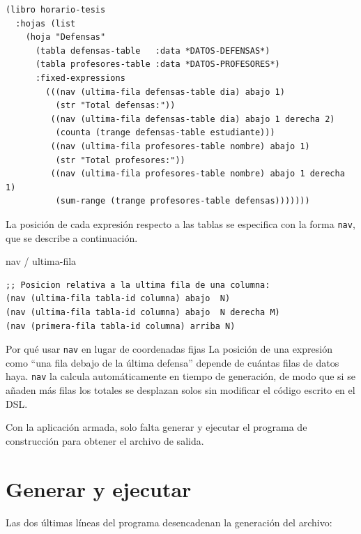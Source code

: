 \documentclass[12pt,a4paper]{report}
\begin{document}
\begin{lstlisting}[caption={Aplicación completa con totales de pie de tabla.}]
(libro horario-tesis
  :hojas (list
    (hoja "Defensas"
      (tabla defensas-table   :data *DATOS-DEFENSAS*)
      (tabla profesores-table :data *DATOS-PROFESORES*)
      :fixed-expressions
        (((nav (ultima-fila defensas-table dia) abajo 1)
          (str "Total defensas:"))
         ((nav (ultima-fila defensas-table dia) abajo 1 derecha 2)
          (counta (trange defensas-table estudiante)))
         ((nav (ultima-fila profesores-table nombre) abajo 1)
          (str "Total profesores:"))
         ((nav (ultima-fila profesores-table nombre) abajo 1 derecha 1)
          (sum-range (trange profesores-table defensas)))))))
\end{lstlisting}

La posición de cada expresión respecto a las tablas se especifica
con la forma \texttt{nav}, que se describe a continuación.

\begin{sintaxisbox}{nav / ultima-fila}
\begin{lstlisting}
;; Posicion relativa a la ultima fila de una columna:
(nav (ultima-fila tabla-id columna) abajo  N)
(nav (ultima-fila tabla-id columna) abajo  N derecha M)
(nav (primera-fila tabla-id columna) arriba N)
\end{lstlisting}
\end{sintaxisbox}

\begin{infobox}{Por qué usar \texttt{nav} en lugar de coordenadas fijas}
La posición de una expresión como ``una fila debajo de la última defensa''
depende de cuántas filas de datos haya.  \texttt{nav} la calcula
automáticamente en tiempo de generación, de modo que si se añaden más filas
los totales se desplazan solos sin modificar el código escrito en el DSL.
\end{infobox}

Con la aplicación armada, solo falta generar y ejecutar el programa de
construcción para obtener el archivo de salida.

\section{Generar y ejecutar}
\label{sec:generar}

Las dos últimas líneas del programa desencadenan la generación del archivo:
\end{document}

